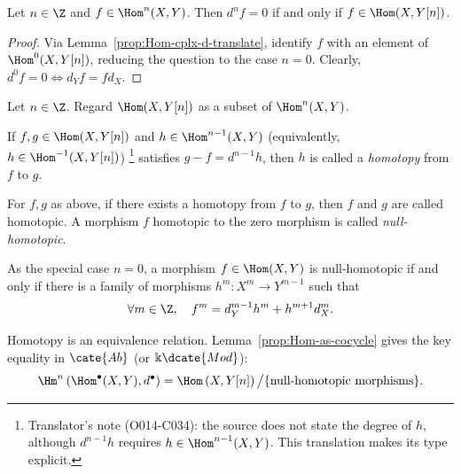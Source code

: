 \begin{lemma}\label{prop:Hom-as-cocycle}
	Let $n\in\Z$ and $f\in\Hom^n(X,Y)$. Then $d^nf=0$ if and only if
	$f\in\Hom(X,Y[n])$.
\end{lemma}
\begin{proof}
	Via Lemma~\ref{prop:Hom-cplx-d-translate}, identify $f$ with an element of
	$\Hom^0(X,Y[n])$, reducing the question to the case $n=0$. Clearly,
	$d^0f=0\iff d_Yf=fd_X$.
\end{proof}

\begin{definition}\label{def:homotopy}
	Let $n\in\Z$. Regard $\Hom(X,Y[n])$ as a subset of $\Hom^n(X,Y)$.
	\begin{compactitem}
		\item If $f,g\in\Hom(X,Y[n])$ and
		$h\in\Hom^{n-1}(X,Y)$ (equivalently,
		$h\in\Hom^{-1}(X,Y[n])$)%
		\footnote{Translator's note (O014-C034): the source does not state the
		degree of $h$, although $d^{n-1}h$ requires
		$h\in\Hom^{n-1}(X,Y)$. This translation makes its type explicit.}
		satisfies $g-f=d^{n-1}h$, then $h$ is called a \emph{homotopy} from
		$f$ to $g$.
		\item For $f,g$ as above, if there exists a homotopy from $f$ to $g$,
		then $f$ and $g$ are called homotopic. A morphism $f$ homotopic to the
		zero morphism is called \emph{null-homotopic}.
	\end{compactitem}

	As the special case $n=0$, a morphism $f\in\Hom(X,Y)$ is null-homotopic
	if and only if there is a family of morphisms $h^m:X^m\to Y^{m-1}$ such
	that
	\[ \forall m \in \Z, \quad f^m = d_Y^{m-1} h^m + h^{m+1} d_X^m . \]
\end{definition}

Homotopy is an equivalence relation. Lemma~\ref{prop:Hom-as-cocycle} gives the
key equality in $\cate{Ab}$ (or $\Bbbk\dcate{Mod}$):
\[ \Hm^n\left(\Hom^\bullet(X, Y), d^\bullet \right) = \Hom\left(X, Y[n]\right) \big/ \{\text{null-homotopic morphisms} \}. \]

